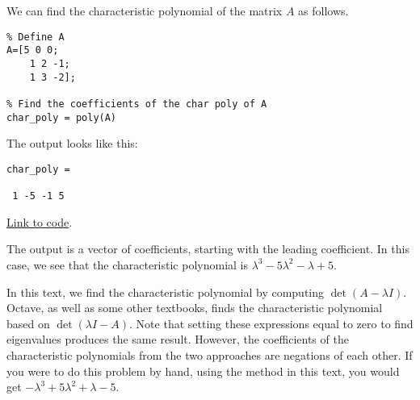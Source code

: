 \documentclass{ximera}
\begin{document}
\begin{template}\label{temp:charPoly}
    We can find the characteristic polynomial of the matrix $A$ as follows.

    \begin{verbatim}
% Define A
A=[5 0 0; 
    1 2 -1; 
    1 3 -2];

% Find the coefficients of the char poly of A
char_poly = poly(A)
    \end{verbatim}

The output looks like this:

\begin{verbatim}
char_poly =

 1 -5 -1 5
\end{verbatim}

\href{https://sagecell.sagemath.org/?z=eJxTVXBJTcvMS1Vw5OVytI02VTBQMLBW4OVSAAJDBSMFXUMEz1hB1yjWmpeLl0tVwS0zL0WhJCNVITk_NS0tMzkzNa-kWCE_DSKWkVikUJCfUwkSABoM4seD-bZgYQ1HTQCF1h-X&lang=octave&interacts=eJyLjgUAARUAuQ==}{Link to code}.

The output is a vector of coefficients, starting with the leading coefficient.  In this case, we see that the characteristic polynomial is $\lambda^3-5\lambda^2-\lambda+5$.

\begin{warning}
    In this text, we find the characteristic polynomial by computing $\det{\left(A-\lambda I\right)}$.  Octave, as well as some other textbooks, finds the characteristic polynomial based on $\det{\left(\lambda I-A\right)}$.  Note that setting these expressions equal to zero to find eigenvalues produces the same result. However, the coefficients of the characteristic polynomials from the two approaches are negations of each other.  If you were to do this problem by hand, using the method in this text, you would get $-\lambda^3+5\lambda^2+\lambda-5$.
\end{warning}
\end{template}
\end{document}

